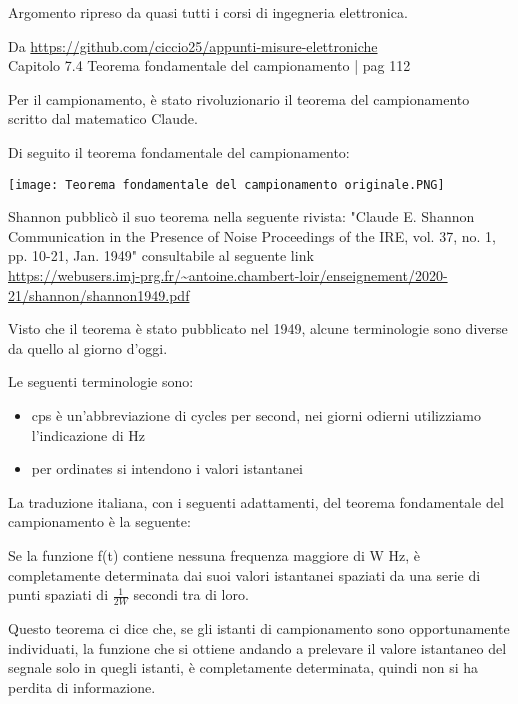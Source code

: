 \begin{tcolorbox}
    Argomento ripreso da quasi tutti i corsi di ingegneria elettronica. \newline 

    Da  \url{https://github.com/ciccio25/appunti-misure-elettroniche} \\
    Capitolo 7.4 Teorema fondamentale del campionamento | pag 112 \newline 

    Per il campionamento, è stato rivoluzionario il teorema del campionamento scritto dal matematico 
    Claude. \newline 

Di seguito il teorema fondamentale del campionamento: 

\texttt{[image: Teorema fondamentale del campionamento originale.PNG]}

\begin{tcolorbox}
    Shannon pubblicò il suo teorema nella seguente rivista: 
    "Claude E. Shannon Communication in the Presence of Noise
Proceedings of the IRE, vol. 37, no. 1, pp. 10-21, Jan. 1949" 
consultabile al seguente link \\ \url{https://webusers.imj-prg.fr/~antoine.chambert-loir/enseignement/2020-21/shannon/shannon1949.pdf}
\end{tcolorbox}

Visto che il teorema è stato pubblicato nel 1949, alcune terminologie sono diverse da quello al giorno d'oggi. \newline 

Le seguenti terminologie sono: 

\begin{itemize}
    \item cps è un'abbreviazione di cycles per second, nei giorni odierni utilizziamo l'indicazione di Hz 
    \item per ordinates si intendono i valori istantanei 
\end{itemize}

La traduzione italiana, con i seguenti adattamenti, del teorema fondamentale del campionamento è la seguente: \newline 

Se la funzione f(t) contiene nessuna frequenza maggiore di W Hz, è completamente determinata dai 
suoi valori istantanei spaziati da una serie di punti spaziati di $\frac{1}{2W}$ secondi tra di loro. \newline 

Questo teorema ci dice che, se gli istanti di campionamento sono opportunamente individuati, 
la funzione che si ottiene andando a prelevare il valore istantaneo del segnale solo in quegli istanti, 
è completamente determinata, quindi non si ha perdita di informazione. \newline 

\end{tcolorbox}

